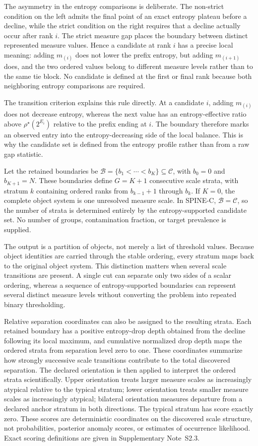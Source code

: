 \documentclass[aip,cha,reprint,superscriptaddress,floatfix]{revtex4-2}
\theoremstyle{definition}
\theoremstyle{remark}
\newcommand{\rhostar}{\rho^{\star}}
\newcommand{\cC}{\mathcal C}
\newcommand{\cB}{\mathcal B}
\begin{document}
The asymmetry in the entropy comparisons is deliberate. The non-strict condition on the left admits the final point of an exact entropy plateau before a decline, while the strict condition on the right requires that a decline actually occur after rank \(i\). The strict measure gap places the boundary between distinct represented measure values. Hence a candidate at rank \(i\) has a precise local meaning: adding \(m_{(i)}\) does not lower the prefix entropy, but adding \(m_{(i+1)}\) does, and the two ordered values belong to different measure levels rather than to the same tie block. No candidate is defined at the first or final rank because both neighboring entropy comparisons are required.

The transition criterion explains this rule directly. At a candidate \(i\), adding \(m_{(i)}\) does not decrease entropy, whereas the next value has an entropy-effective ratio above \(\rhostar(2^{E_i})\) relative to the prefix ending at \(i\). The boundary therefore marks an observed entry into the entropy-decreasing side of the local balance. This is why the candidate set is defined from the entropy profile rather than from a raw gap statistic.

Let the retained boundaries be \(\cB=\{b_1<\cdots<b_K\}\subseteq\cC\), with \(b_0=0\) and \(b_{K+1}=N\). These boundaries define \(G=K+1\) consecutive scale strata, with stratum \(k\) containing ordered ranks from \(b_{k-1}+1\) through \(b_k\). If \(K=0\), the complete object system is one unresolved measure scale. In SPINE-C, \(\cB=\cC\), so the number of strata is determined entirely by the entropy-supported candidate set. No number of groups, contamination fraction, or target prevalence is supplied.

The output is a partition of objects, not merely a list of threshold values. Because object identities are carried through the stable ordering, every stratum maps back to the original object system. This distinction matters when several scale transitions are present. A single cut can separate only two sides of a scalar ordering, whereas a sequence of entropy-supported boundaries can represent several distinct measure levels without converting the problem into repeated binary thresholding.

Relative separation coordinates can also be assigned to the resulting strata. Each retained boundary has a positive entropy-drop depth obtained from the decline following its local maximum, and cumulative normalized drop depth maps the ordered strata from separation level zero to one. These coordinates summarize how strongly successive scale transitions contribute to the total discovered separation. The declared orientation is then applied to interpret the ordered strata scientifically. Upper orientation treats larger measure scales as increasingly atypical relative to the typical stratum; lower orientation treats smaller measure scales as increasingly atypical; bilateral orientation measures departure from a declared anchor stratum in both directions. The typical stratum has score exactly zero. These scores are deterministic coordinates on the discovered scale structure, not probabilities, posterior anomaly scores, or estimates of occurrence likelihood. Exact scoring definitions are given in Supplementary Note~S2.3.
\end{document}
